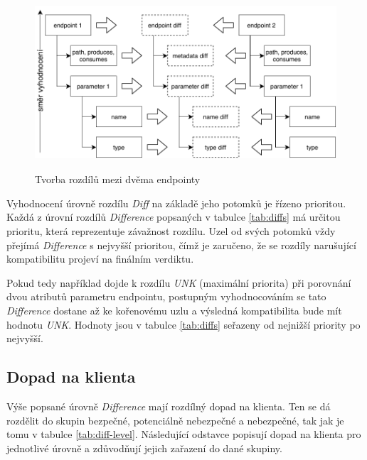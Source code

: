\documentclass[czech,DP]{thesiskiv}
\begin{document}
\begin{figure}[h]
	\centering
	\includegraphics[height=6.5cm]{compatibility-construction}
	\caption{Tvorba rozdílů mezi dvěma endpointy}
	\label{fig:compatibility-creation}
\end{figure}

Vyhodnocení úrovně rozdílu \textit{Diff} na základě jeho potomků je řízeno prioritou. Každá z úrovní rozdílů \textit{Difference} popsaných v tabulce \ref{tab:diffs} má určitou prioritu, která reprezentuje závažnost rozdílu. Uzel od svých potomků vždy přejímá \textit{Difference} s nejvyšší prioritou, čímž je zaručeno, že se rozdíly narušující kompatibilitu projeví na finálním verdiktu.

Pokud tedy například dojde k rozdílu \textit{UNK} (maximální priorita) při porovnání dvou atributů parametru endpointu, postupným vyhodnocováním se tato \textit{Difference} dostane až ke kořenovému uzlu a výsledná kompatibilita bude mít hodnotu \textit{UNK}. Hodnoty jsou v tabulce \ref{tab:diffs} seřazeny od nejnižší priority po nejvyšší.


\subsection{Dopad na klienta}

Výše popsané úrovně \textit{Difference} mají rozdílný dopad na klienta. Ten se dá rozdělit do skupin bezpečné, potenciálně nebezpečné a nebezpečné, tak jak je tomu v tabulce \ref{tab:diff-level}. Následující odstavce popisují dopad na klienta pro jednotlivé úrovně a zdůvodňují jejich zařazení do dané skupiny.
\end{document}
